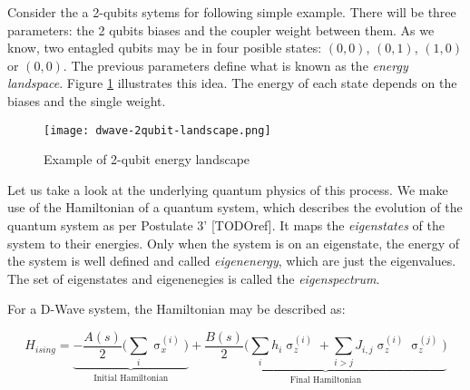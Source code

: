 Consider the a 2-qubits sytems for following simple example. There will be three parameters: the 2 qubits biases and the coupler weight between them. As we know, two entagled qubits may be in four posible states: $(0,0)$, $(0,1)$, $(1,0)$ or $(0,0)$. The previous parameters define what is known as the \emph{energy landspace}. Figure \ref{fig:dwave-2qubit-landscape} illustrates this idea. The energy of each state depends on the biases and the single weight.

\begin{figure}[h]
	\texttt{[image: dwave-2qubit-landscape.png]}
	\centering
	\caption{Example of 2-qubit energy landscape \cite{DWaveDoc-QuantumAnnealing}}
	\label{fig:dwave-2qubit-landscape}
\end{figure}

Let us take a look at the underlying quantum physics of this process. We make use of the Hamiltonian of a quantum system, which describes the evolution of the quantum system as per Postulate 3' [TODOref]. It maps the \emph{eigenstates} of the system to their energies. Only when the system is on an eigenstate, the energy of the system is well defined and called \emph{eigenenergy}, which are just the eigenvalues. The set of eigenstates and eigenenegies is called the \emph{eigenspectrum}.

For a D-Wave system, the Hamiltonian may be described as:

$$ H_{ising} = \underbrace{- \frac{A(s)}{2} \bigg( \sum_i \upsigma_x^{(i)} \bigg)}_\text{Initial Hamiltonian} 
			+ \underbrace{\frac{B(s)}{2} \bigg( \sum_i h_i \upsigma_z^{(i)} + \sum_ {i > j} J_{i,j} \upsigma_z^{(i)} \upsigma_z^{(j)} \bigg)}_\text{Final Hamiltonian} $$









